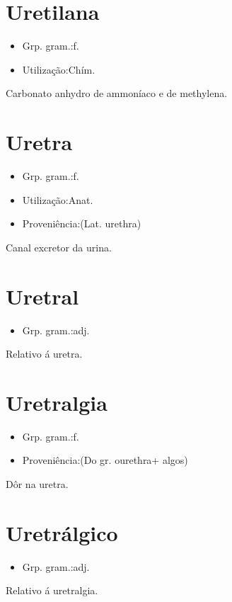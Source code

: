 \documentclass{article}
\begin{document}
\section{Uretilana}
\begin{itemize}
\item {Grp. gram.:f.}
\end{itemize}
\begin{itemize}
\item {Utilização:Chím.}
\end{itemize}
Carbonato anhydro de ammoníaco e de methylena.
\section{Uretra}
\begin{itemize}
\item {Grp. gram.:f.}
\end{itemize}
\begin{itemize}
\item {Utilização:Anat.}
\end{itemize}
\begin{itemize}
\item {Proveniência:(Lat. \textunderscore urethra\textunderscore )}
\end{itemize}
Canal excretor da urina.
\section{Uretral}
\begin{itemize}
\item {Grp. gram.:adj.}
\end{itemize}
Relativo á uretra.
\section{Uretralgia}
\begin{itemize}
\item {Grp. gram.:f.}
\end{itemize}
\begin{itemize}
\item {Proveniência:(Do gr. \textunderscore ourethra\textunderscore  + \textunderscore algos\textunderscore )}
\end{itemize}
Dôr na uretra.
\section{Uretrálgico}
\begin{itemize}
\item {Grp. gram.:adj.}
\end{itemize}
Relativo á uretralgia.
\end{document}
